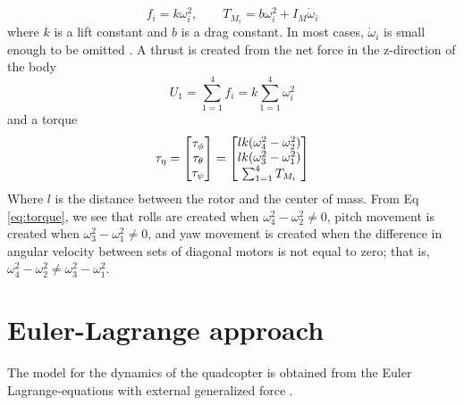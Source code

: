 \documentclass[11pt]{ucthesis}
\begin{document}
\begin{equation}\label{eq.forces}
f_i = k\omega_i^2 ,\qquad T_{M_i} = b\omega_i^2 + I_M \dot{\omega}_i
\end{equation}
where $k$ is a lift constant and $b$ is a drag constant. In most cases, $\dot{\omega}_i$ is small enough to be omitted \cite{luukkonen2011modelling}. A thrust is created from the net force in the z-direction of the body
\begin{equation}\label{eq:thrust}
U_1 = \sum_{1=1}^{4}f_i = k\sum_{1=1}^{4}\omega_i^2
\end{equation}
and a torque 
\begin{equation}
\bold\tau_{\eta} = 
\begin{bmatrix}
\tau_\phi\\
\tau_\theta\\
\tau_\psi
\end{bmatrix} = 
\begin{bmatrix}
lk(\omega_4^2 - \omega_2^2)\\
lk(\omega_3^2 - \omega_1^2)\\
\sum_{1=1}^{4}T_{M_i}
\end{bmatrix}
\label{eq:torque}
\end{equation}
Where $l$ is the distance between the rotor and the center of mass. From Eq \ref{eq:torque}, we see that rolls are created when $\omega_4^2 - \omega_2^2 \neq 0$, pitch movement is created when $\omega_3^2 - \omega_1^2 \neq 0$, and yaw movement is created when the difference in angular velocity between sets of diagonal motors is not equal to zero; that is, $\omega_4^2 - \omega_2^2 \neq \omega_3^2 - \omega_1^2 $.

\section{Euler-Lagrange approach} 
The model for the dynamics of the quadcopter is obtained from the Euler Lagrange-equations with external generalized force \cite{castillo2005experimental, raffo2010integral, luukkonen2011modelling, garcia2006modelling}.
\end{document}
